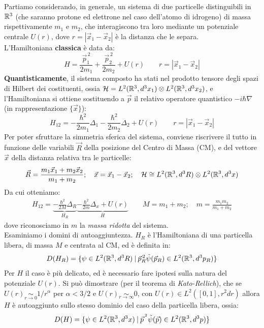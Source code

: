 \documentclass[../../FisicaTeorica.tex]{subfiles}
\begin{document}
Partiamo considerando, in generale, un sistema di due particelle distinguibili in $\mathbb{R}^3$ (che saranno protone ed elettrone nel caso dell'atomo di idrogeno) di massa rispettivamente $m_1$ e $m_2$, che interagiscono tra loro mediante un potenziale centrale $U(r)$, dove $r=|\vec{x}_1 - \vec{x}_2|$ è la distanza che le separa.\\
L'Hamiltoniana \textbf{classica} è data da:
\[
H=\frac{\vec{p}_1^{\,2}}{2m_1}+\frac{\vec{p}_2^{\,2}}{2m_2}+U(r)\qquad r=|\vec{x}_1 - \vec{x}_2|
\]
\textbf{Quantisticamente}, il sistema composto ha stati nel prodotto tensore degli spazi di Hilbert dei costituenti, ossia $\mathcal{H}=L^2(\mathbb{R}^3, d^3x_1)\otimes L^2(\mathbb{R}^3, d^3x_2)$, e l'Hamiltoniana si ottiene sostituendo a $\vec{p}$  il relativo operatore quantistico $-i\hbar \nabla$ (in rappresentazione $\{\vec{x}\}$):
\[
H_{12} = -\frac{\hbar^2}{2m_1} \Delta_1 - \frac{\hbar^2}{2m_2} \Delta_2 + U(r)\qquad r=|\vec{x}_1 - \vec{x}_2|
\]
Per poter sfruttare la simmetria sferica del sistema, conviene riscrivere il tutto in funzione delle variabili $\vec{R}$ della posizione del Centro di Massa (CM), e del vettore $\vec{x}$ della distanza relativa tra le particelle:
\[
\vec{R}=\frac{m_1 \vec{x}_1 + m_2 \vec{x}_2}{m_1+m_2}; \quad \vec{x}=\vec{x}_1 -\vec{x}_2; \quad \mathcal{H} \cong L^2(\mathbb{R}^3, d^3R) \otimes L^2(\mathbb{R}^3, d^3x)
\]
Da cui otteniamo:
\begin{align}
H_{12}=\underbrace{-\frac{\hbar^2}{2M}\Delta_R}_{H_R} \underbrace{- \frac{\hbar^2}{2m}\Delta_x + U(r)}_{H}\qquad M=m_1+m_2; \quad m=\frac{m_1 m_2}{m_1+m_2}
\label{eqn:hamiltoniana_centrale}
\end{align}
dove riconosciamo in $m$ la \textit{massa ridotta} del sistema.\\
Esaminiamo i domini di autoaggiuntezza. $H_R$ è l'Hamiltoniana di una particella libera, di massa $M$ e centrata al CM, ed è definita in:
\[
D(H_R)=\{\psi\in L^2(\mathbb{R}^3, d^3R) \>|\> \vec{p}_R^{\,2} \tilde{\psi}(\vec{p}_R) \in L^2(\mathbb{R}^3, d^3 p_R)\}
\]
Per $H$ il caso è più delicato, ed è necessario fare ipotesi sulla natura del potenziale $U(r)$. Si può dimostrare (per il teorema di \textit{Kato-Rellich}), che se $U(r) \underset{r\to 0}{\sim} 1/r^\alpha$ per $\alpha < 3/2$ e $U(r) \underset{r\to\infty}{\sim}0$, con $U(r) \in L^2([0,1], r^2 dr)$ allora $H$ è autoaggiunto sullo stesso dominio del caso della particella libera, ossia:
\[
D(H) = \{\psi \in L^2(\mathbb{R}^3, d^3 x)\>|\> \vec{p}^{\,^2} \tilde{\psi}(\vec{p}) \in L^2(\mathbb{R}^3, d^3 p)\}
\]
\end{document}
